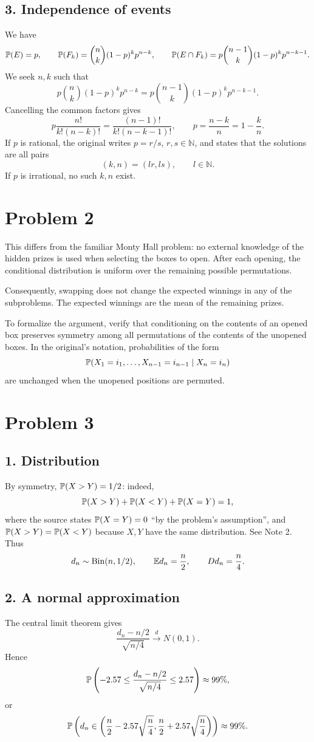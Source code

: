 \documentclass[11pt,a4paper]{article}
\begin{document}
\subsection*{3. Independence of events}
We have
\[
\P(E)=p,\qquad\P(F_k)=\binom nk(1-p)^kp^{n-k},
\qquad\P(E\cap F_k)=p\binom{n-1}k(1-p)^kp^{n-k-1}.
\]
We seek $n,k$ such that
\[
p\binom nk(1-p)^kp^{n-k}=p\binom{n-1}k(1-p)^kp^{n-k-1}.
\]
Cancelling the common factors gives
\[
p\frac{n!}{k!(n-k)!}=\frac{(n-1)!}{k!(n-k-1)!},
\qquad p=\frac{n-k}n=1-\frac kn.
\]
If $p$ is rational, the original writes $p=r/s$, $r,s\in\mathbb N$, and states that the solutions are all pairs
\[
(k,n)=(lr,ls),\qquad l\in\mathbb N.\tag{Note 1}
\]
If $p$ is irrational, no such $k,n$ exist.

\section*{Problem 2}
This differs from the familiar Monty Hall problem: no external knowledge of the hidden prizes is used when selecting the boxes to open. After each opening, the conditional distribution is uniform over the remaining possible permutations.

Consequently, swapping does not change the expected winnings in any of the subproblems. The expected winnings are the mean of the remaining prizes.

To formalize the argument, verify that conditioning on the contents of an opened box preserves symmetry among all permutations of the contents of the unopened boxes. In the original's notation, probabilities of the form
\[
\P(X_1=i_1,\ldots,X_{n-1}=i_{n-1}\mid X_n=i_n)
\]
are unchanged when the unopened positions are permuted.

\section*{Problem 3}
\subsection*{1. Distribution}
By symmetry, $\P(X>Y)=1/2$: indeed,
\[
\P(X>Y)+\P(X<Y)+\P(X=Y)=1,
\]
where the source states $\P(X=Y)=0$ ``by the problem's assumption'', and $\P(X>Y)=\P(X<Y)$ because $X,Y$ have the same distribution. See Note 2. Thus
\[
d_n\sim\operatorname{Bin}(n,1/2),\qquad\E d_n=\frac n2,\qquad Dd_n=\frac n4.
\]
\subsection*{2. A normal approximation}
The central limit theorem gives
\[
\frac{d_n-n/2}{\sqrt{n/4}}\xrightarrow{d}N(0,1).
\]
Hence
\[
\P\left(-2.57\le\frac{d_n-n/2}{\sqrt{n/4}}\le2.57\right)\approx99\%,
\]
or
\[
\P\left(d_n\in\left(\frac n2-2.57\sqrt{\frac n4},
\frac n2+2.57\sqrt{\frac n4}\right)\right)\approx99\%.
\]
\end{document}
